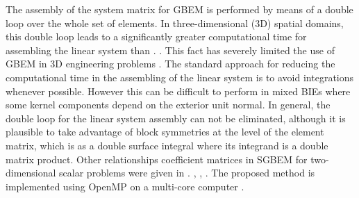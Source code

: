 \documentclass[oneside,onecolumn,10pt,final]{asme2ej}
\begin{document}
\noindent
The assembly of the system matrix for GBEM is performed 
by means of a double loop over the whole set of elements. 
%
In three-dimensional (3D) spatial domains, this double 
loop leads to a significantly greater computational time
for assembling the linear system than .
%
. 
This fact has severely limited the use of GBEM in 3D 
engineering problems \cite{rf:iemma}. %
%
The standard approach for reducing the computational time 
in the assembling of the linear system is to avoid integrations 
whenever possible. However this can be difficult to 
perform in mixed BIEs where some kernel components depend  
on the exterior unit normal. %
%
In general, the double loop for the linear system assembly  
can not be eliminated, although it is plausible to 
take advantage of block symmetries at the level of the 
element matrix, which is  as a double surface 
integral where its integrand is a double matrix product.
%
Other relationships  coefficient matrices in SGBEM for
two-dimensional scalar problems were given in \cite{rf:yu-jam}.
%
\cite{rf:mukherjee-telukunta, rf:enief07-vfachinotti-full},
\cite{rf:bandopadhyay-tripathi-chakraborty,
  rf:tripathi-brushan-anwarbeg,rf:tripathi-yadav-anwarbeg},
. 
The proposed method is implemented using OpenMP on
a multi-core computer \cite{rf:diaz-caro-ninio}.
\end{document}
